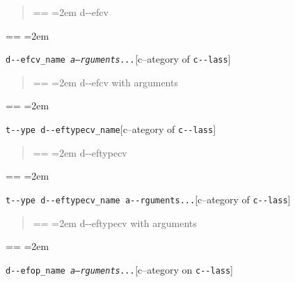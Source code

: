 \documentclass{book}
\makeatletter
\newenvironment{GNUTexinfopreformatted}{%
  \par\obeylines\obeyspaces\frenchspacing
  \parskip=\z@\parindent=\z@}{}
\makeatother
\begin{document}
%
\begin{quote}
\unskip{\parskip=0pt\noindent}%
\begin{GNUTexinfopreformatted}
\leftskip=2em\relax\ttfamily%
d{-}{-}efcv
\end{GNUTexinfopreformatted}
\end{quote}
\begin{GNUTexinfopreformatted}
\leftskip=2em\relax\ttfamily%

\end{GNUTexinfopreformatted}
\noindent\texttt{d{-}{-}efcv\_name \EmbracOn{}\textnormal{\textsl{a--rguments...}}\EmbracOff{}}\hfill[c--ategory of \texttt{c{-}{-}lass}]

%
\begin{quote}
\unskip{\parskip=0pt\noindent}%
\begin{GNUTexinfopreformatted}
\leftskip=2em\relax\ttfamily%
d{-}{-}efcv with arguments
\end{GNUTexinfopreformatted}
\end{quote}
\begin{GNUTexinfopreformatted}
\leftskip=2em\relax\ttfamily%

\end{GNUTexinfopreformatted}
\noindent\texttt{t{-}{-}ype d{-}{-}eftypecv\_name}\hfill[c--ategory of \texttt{c{-}{-}lass}]

%
\begin{quote}
\unskip{\parskip=0pt\noindent}%
\begin{GNUTexinfopreformatted}
\leftskip=2em\relax\ttfamily%
d{-}{-}eftypecv
\end{GNUTexinfopreformatted}
\end{quote}
\begin{GNUTexinfopreformatted}
\leftskip=2em\relax\ttfamily%

\end{GNUTexinfopreformatted}
\noindent\texttt{t{-}{-}ype d{-}{-}eftypecv\_name a{-}{-}rguments...}\hfill[c--ategory of \texttt{c{-}{-}lass}]

%
\begin{quote}
\unskip{\parskip=0pt\noindent}%
\begin{GNUTexinfopreformatted}
\leftskip=2em\relax\ttfamily%
d{-}{-}eftypecv with arguments
\end{GNUTexinfopreformatted}
\end{quote}
\begin{GNUTexinfopreformatted}
\leftskip=2em\relax\ttfamily%

\end{GNUTexinfopreformatted}
\noindent\texttt{d{-}{-}efop\_name \EmbracOn{}\textnormal{\textsl{a--rguments...}}\EmbracOff{}}\hfill[c--ategory on \texttt{c{-}{-}lass}]
\end{document}
